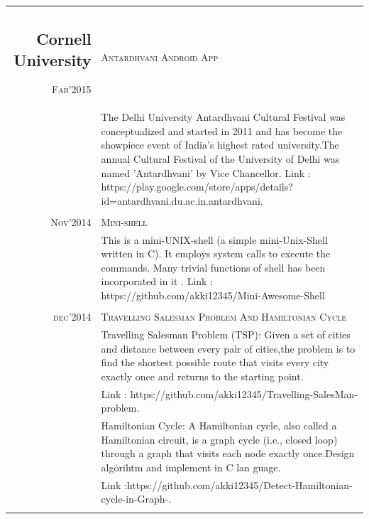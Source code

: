 \documentclass[]{deedy-resume-openfont}
\begin{document}
\begin{minipage}[t]{0.66\textwidth}
\begin{tabular}{r|p{11cm}}
\subsection{Cornell University}
\textsc{Fab'2015} & \textsc{Antardhvani Android App}\\&\footnotesize{The Delhi University Antardhvani Cultural Festival was conceptualized and started in 2011 and has become the showpiece event of India’s highest rated university.The annual Cultural Festival of the University of Delhi was named ’Antardhvani’ by Vice Chancellor.
Link : https://play.google.com/store/apps/details?id=antardhvani.du.ac.in.antardhvani.}\\\\
\textsc{Nov'2014} & \textsc{Mini-shell}\\&\footnotesize{This is a mini-UNIX-shell (a simple mini-Unix-Shell written in C). It employs system calls to execute the commands. Many trivial functions of shell has been incorporated in it   .
Link : https://github.com/akki12345/Mini-Awesome-Shell}\\\\
\textsc{dec'2014} & \textsc{Travelling Salesman Problem And Hamiltonian Cycle}\\&\footnotesize{Travelling Salesman Problem (TSP): Given a set of cities and distance between every pair of cities,the problem is to find the shortest possible route that visits every city exactly once and returns to the starting point.}
\\&\footnotesize{Link : https://github.com/akki12345/Travelling-SalesMan-problem.}
\\&\footnotesize{Hamiltonian Cycle: A Hamiltonian cycle, also called a Hamiltonian circuit, is a graph cycle (i.e., closed loop) through a graph that visits each node exactly once.Design algorihtm and implement in C lan
guage.}
\\&\footnotesize{Link :https://github.com/akki12345/Detect-Hamiltonian-cycle-in-Graph-.}\\\\
\end{tabular}

\end{minipage}
\end{document}
